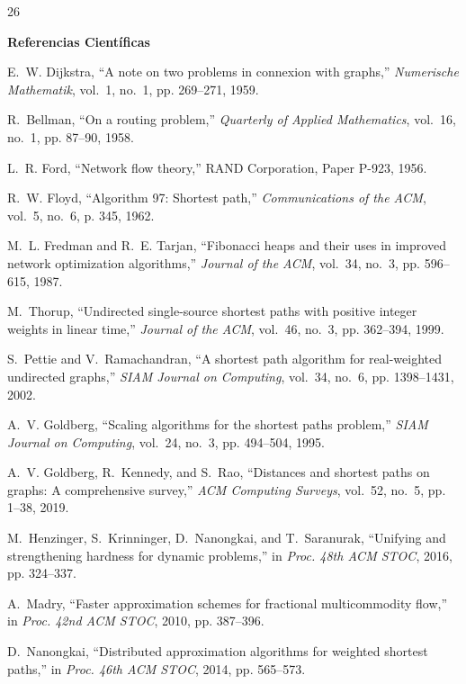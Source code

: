 \documentclass[conference]{IEEEtran}
\begin{document}
\clearpage
\begin{thebibliography}{26}

\item[] \noindent\textbf{Referencias Científicas}
\smallskip

E.~W. Dijkstra, ``A note on two problems in connexion with graphs,''
\emph{Numerische Mathematik}, vol.~1, no.~1, pp. 269--271, 1959.

R.~Bellman, ``On a routing problem,'' \emph{Quarterly of Applied Mathematics},
vol.~16, no.~1, pp. 87--90, 1958.

L.~R. Ford, ``Network flow theory,'' RAND Corporation, Paper P-923, 1956.

R.~W. Floyd, ``Algorithm 97: Shortest path,'' \emph{Communications of the ACM},
vol.~5, no.~6, p. 345, 1962.

M.~L. Fredman and R.~E. Tarjan, ``Fibonacci heaps and their uses in improved
network optimization algorithms,'' \emph{Journal of the ACM}, vol.~34, no.~3,
pp. 596--615, 1987.

M.~Thorup, ``Undirected single-source shortest paths with positive integer
weights in linear time,'' \emph{Journal of the ACM}, vol.~46, no.~3,
pp. 362--394, 1999.

S.~Pettie and V.~Ramachandran, ``A shortest path algorithm for real-weighted
undirected graphs,'' \emph{SIAM Journal on Computing}, vol.~34, no.~6,
pp. 1398--1431, 2002.

A.~V. Goldberg, ``Scaling algorithms for the shortest paths problem,''
\emph{SIAM Journal on Computing}, vol.~24, no.~3, pp. 494--504, 1995.

A.~V. Goldberg, R.~Kennedy, and S.~Rao, ``Distances and shortest paths on graphs:
A comprehensive survey,'' \emph{ACM Computing Surveys}, vol.~52, no.~5,
pp. 1--38, 2019.

M.~Henzinger, S.~Krinninger, D.~Nanongkai, and T.~Saranurak,
``Unifying and strengthening hardness for dynamic problems,''
in \emph{Proc. 48th ACM STOC}, 2016, pp. 324--337.

A.~Madry, ``Faster approximation schemes for fractional multicommodity flow,''
in \emph{Proc. 42nd ACM STOC}, 2010, pp. 387--396.

D.~Nanongkai, ``Distributed approximation algorithms for weighted shortest
paths,'' in \emph{Proc. 46th ACM STOC}, 2014, pp. 565--573.


\end{thebibliography}
\end{document}
